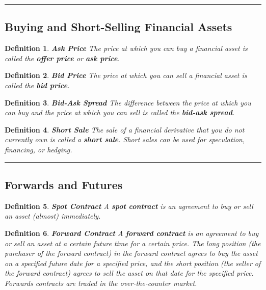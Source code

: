 \documentclass[letterpaper,10pt]{article}
\newtheorem{df}{Definition}[section]
\begin{document}
\bigskip

\hrule

\bigskip

\subsection{Buying and Short-Selling Financial Assets}

\begin{df}{\bf Ask Price}
The price at which you can buy a financial asset is called the {\bf offer price} or {\bf ask price}.
\end{df}

\begin{df}{\bf Bid Price}
The price at which you can sell a financial asset is called the {\bf bid price}.
\end{df}

\begin{df}{\bf Bid-Ask Spread}
The difference between the price at which you can buy and the price at which you can sell is called the {\bf bid-ask spread}.
\end{df}

\begin{df}{\bf Short Sale}
The sale of a financial derivative that you do not currently own is called a {\bf short sale}.  Short sales can be used for {\em speculation}, {\em financing}, or {\em hedging}.
\end{df}

\bigskip

\hrule

\bigskip

\subsection{Forwards and Futures}

\begin{df}{\bf Spot Contract}
A {\bf spot contract} is an agreement to buy or sell an asset (almost) immediately. 
\end{df}

\begin{df}{\bf Forward Contract}
A {\bf forward contract} is an agreement to buy or sell an asset at a certain future time for a certain price.  The {\em long position} (the purchaser of the forward contract) in the forward contract agrees to {\em buy} the asset on a specified future date for a specified price, and the {\em short position} (the seller of the forward contract) agrees to sell the asset on that date for the specified price.  Forwards contracts are traded in the over-the-counter market.
\end{df}
\end{document}
